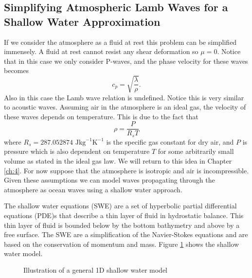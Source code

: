 \documentclass[twoside]{bsu-ms}
\begin{document}
\subsection{Simplifying Atmospheric Lamb Waves for a Shallow Water Approximation}\label{subsec:1.1.3}
If we consider the atmosphere as a fluid at rest this problem can be simplified immensely. A fluid at rest cannot resist any shear deformation so $\mu=0$. Notice that in this case we only consider P-waves, and the phase velocity for these waves becomes
\begin{equation}\label{eq:1.15}
	c_{p}=\sqrt{\frac{\lambda}{\rho}}. 
\end{equation}
Also in this case the Lamb wave relation is undefined. Notice this is very similar to acoustic waves. Assuming air in the atmosphere is an ideal gas, the velocity of these waves depends on temperature. This is due to the fact that
\begin{equation}\label{eq:1.16}
	\rho=\frac{P}{R_{s}T}
\end{equation}
where $R_{s}=287.052874$ $\mathrm{Jkg}^{-1}\mathrm{K}^{-1}$ is the specific gas constant for dry air, and $P$ is pressure which is also dependent on temperature $T$ for some arbitrarily small volume as stated in the ideal gas law. We will return to this idea in Chapter \ref{ch:4}. For now suppose that the atmosphere is isotropic and air is incompressible. Given these assumptions we can model waves propagating through the atmosphere as ocean waves using a shallow water approach.

The shallow water equations (SWE) are a set of hyperbolic partial differential equations (PDE)s that describe a thin layer of fluid in hydrostatic balance. This thin layer of fluid is bounded below by the bottom bathymetry and above by a free surface. The SWE are a simplification of the Navier-Stokes equations and are based on the conservation of momentum and mass. Figure \ref{fig:1.2} shows the shallow water model.
\begin{figure}[!htbp]
	\vspace{-15pt}
	\centering
	
	\caption{Illustration of a general 1D shallow water model}
	\label{fig:1.2}
\end{figure}
\pagebreak
\end{document}
